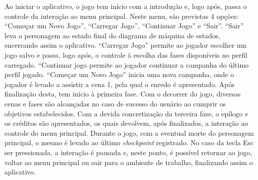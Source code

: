 Ao iniciar o aplicativo, o jogo tem início com a introdução e, logo após, passa o controle da interação ao menu principal. Neste menu, são previstas 4 opções: ``Começar um Novo Jogo'', ``Carregar Jogo'', ``Continuar Jogo'' e ``Sair''. ``Sair'' leva o personagem ao estado final do diagrama de máquina de estados, encerrando assim o aplicativo. ``Carregar Jogo'' permite ao jogador escolher um jogo salvo e passa, logo após, o controle à escolha das fases disponíveis no perfil carregado. ``Continuar jogo permite ao jogador continuar a campanha do último perfil jogado. ``Começar um Novo Jogo'' inicia uma nova campanha, onde o jogador é levado a assistir a cena 1, pela qual o enredo é apresentado. Após finalização desta, tem início à primeira fase. Com o decorrer do jogo,  diversas cenas e fases são alcançadas no caso de sucesso do usuário ao  cumprir os objetivos estabelecidos. Com a devida concretização da terceira fase, o epílogo e os créditos são apresentados, os quais devolvem, após finalizados, a interação ao controle do menu principal. Durante o jogo, com a eventual morte do personagem principal, o mesmo é levado ao último \textit{checkpoint} registrado. No caso da tecla Esc ser pressionada, a interação é pausada e, neste ponto, é possível retornar ao jogo, voltar ao menu principal ou sair para o ambiente de trabalho, finalizando assim o aplicativo.

